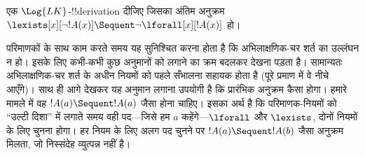 \documentclass[../../../include/open-logic-section]{subfiles}
\begin{document}


\begin{ex}
एक $\Log{LK}$-!!{derivation} दीजिए जिसका अंतिम अनुक्रम $\lexists[x][\lnot !A(x)]
\Sequent \lnot \lforall[x][!A(x)]$ हो।

परिमाणकों के साथ काम करते समय यह सुनिश्चित करना होता है कि अभिलाक्षणिक-चर
शर्त का उल्लंघन न हो। इसके लिए कभी-कभी कुछ अनुमानों को लगाने का क्रम बदलकर
देखना पड़ता है। सामान्यतः अभिलाक्षणिक-चर शर्त के अधीन नियमों को पहले सँभालना
सहायक होता है (पूरे प्रमाण में वे नीचे आएँगे)। साथ ही आगे देखकर यह अनुमान
लगाना उपयोगी है कि प्रारंभिक अनुक्रम कैसा होगा। हमारे मामले में वह
$!A(a) \Sequent !A(a)$ जैसा होना चाहिए। इसका अर्थ है कि परिमाणक-नियमों को
``उल्टी दिशा'' में लगाते समय वही पद---जिसे हम $a$ कहेंगे---$\lforall$ और
$\lexists$, दोनों नियमों के लिए चुनना होगा। हर नियम के लिए अलग पद चुनने पर
$!A(a) \Sequent !A(b)$ जैसा अनुक्रम मिलता, जो निस्संदेह व्युत्पन्न नहीं है।


\end{ex}
\end{document}

